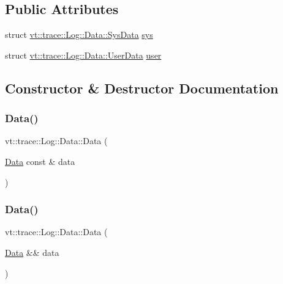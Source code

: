 \subsection*{Public Attributes}
\begin{DoxyCompactItemize}
\item 
struct \hyperlink{structvt_1_1trace_1_1_log_1_1_data_1_1_sys_data}{vt\+::trace\+::\+Log\+::\+Data\+::\+Sys\+Data} \hyperlink{unionvt_1_1trace_1_1_log_1_1_data_a71322b10139cee6014cd6be83c99b3d9}{sys}
\item 
struct \hyperlink{structvt_1_1trace_1_1_log_1_1_data_1_1_user_data}{vt\+::trace\+::\+Log\+::\+Data\+::\+User\+Data} \hyperlink{unionvt_1_1trace_1_1_log_1_1_data_a8d893c0de3ee2fca0852607fa908a2e6}{user}
\end{DoxyCompactItemize}


\subsection{Constructor \& Destructor Documentation}
\mbox{\label{unionvt_1_1trace_1_1_log_1_1_data_a8361a2cf0feb1a5c238766ce0608d8c2}} 
\subsubsection{\texorpdfstring{Data()}{Data()}\hspace{0.1cm}{\footnotesize\ttfamily [1/4]}}
{\footnotesize\ttfamily vt\+::trace\+::\+Log\+::\+Data\+::\+Data (\begin{DoxyParamCaption}\item[{\hyperlink{unionvt_1_1trace_1_1_log_1_1_data}{Data} const \&}]{data }\end{DoxyParamCaption})\hspace{0.3cm}{\ttfamily [inline]}}

\mbox{\label{unionvt_1_1trace_1_1_log_1_1_data_ad53002e880d4c931f76c62485e2d798a}} 
\subsubsection{\texorpdfstring{Data()}{Data()}\hspace{0.1cm}{\footnotesize\ttfamily [2/4]}}
{\footnotesize\ttfamily vt\+::trace\+::\+Log\+::\+Data\+::\+Data (\begin{DoxyParamCaption}\item[{\hyperlink{unionvt_1_1trace_1_1_log_1_1_data}{Data} \&\&}]{data }\end{DoxyParamCaption})\hspace{0.3cm}{\ttfamily [inline]}}

